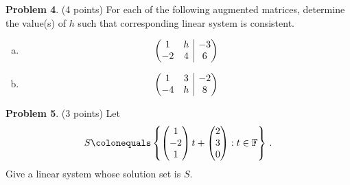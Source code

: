 \documentclass[reqno, 12pt]{amsart}
\makeatletter
\theoremstyle{definition}
\newenvironment{problab}[1]
{\noindent\textbf{Problem #1}.}
{\vskip 6pt}
\theoremstyle{remark}
\newcommand{\F}{\mathbb F}
\newenvironment{amatrix}[1]{%
  \left(\begin{array}{@{}*{#1}{c}|c@{}}
}{%
  \end{array}\right)
}
\makeatother
\begin{document}
\begin{problab}{4} (4 points)
  For each of the following augmented matrices, determine the value(s) of $h$ such that corresponding linear system is consistent.
  \begin{enumerate}[(a)]
    \item 
      \begin{equation*}
        \begin{amatrix}{2}
          1 & h & -3\\
          -2 & 4 & 6
        \end{amatrix}
      \end{equation*}
     \item 
      \begin{equation*}
        \begin{amatrix}{2}
          1 & 3 & -2\\
          -4 & h & 8
        \end{amatrix}
     \end{equation*}
  \end{enumerate}
\end{problab}

\begin{problab}{5} (3 points)
  Let
  \begin{equation*}
    S \colonequals
    \left\{
      \begin{pmatrix} 1\\ -2\\ 1\end{pmatrix} t +
      \begin{pmatrix} 2\\ 3\\ 0\end{pmatrix} : t \in \F
    \right\} \, .
  \end{equation*}
  Give a linear system whose solution set is $S$.
\end{problab}
\end{document}
